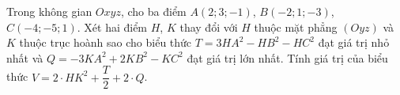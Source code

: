 \begin{ex}
Trong không gian $Oxyz$, cho ba điểm $A(2;3;-1)$, $B(-2;1;-3)$, $C(-4;-5;1)$. Xét hai điểm $H$, $K$ thay đổi với $H$ thuộc mặt phẳng $(Oyz)$ và $K$ thuộc trục hoành sao cho biểu thức $T=3HA^2-HB^2-HC^2$ đạt giá trị nhỏ nhất và $Q=-3KA^2+2KB^2-KC^2$ đạt giá trị lớn nhất. Tính giá trị của biểu thức $V=2\cdot HK^2+\dfrac T2+2\cdot Q$.
\end{ex}

